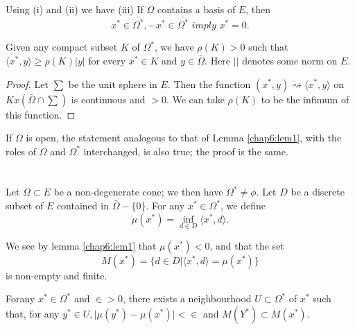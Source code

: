 Using (i) and (ii) we have 
(iii) If $\Omega $ contains a basis of $E$, then 
$$
x^* \in \bar{\Omega^*}, -x^* \in \bar{\Omega^*} \textit{ imply } x^* = 0.
$$

\setcounter{lem}{0}
\begin{lem}\label{chap6:lem1} %
  Given any compact subset $K$ of $\Omega^*$, we have $\rho (K) > 0$
  such that $\langle x^*, y\rangle \geq \rho (K) |y|$ for every $x^*
  \in K$ and $y \in \bar{\Omega}$. Here $| |$ denotes some norm on $E$.  
\end{lem}

\begin{proof}
  Let $\sum$ be the unit sphere in $E$. Then the function $(x^*,
  y)\rightsquigarrow \langle x^*, y\rangle$ on $K x (\bar{\Omega} \cap \sum )$
  is continuous and $> 0$. We can take $\rho (K)$ to be the infimum
  of this function. 
\end{proof}

\begin{remark*}
  If $\Omega$ is open, the statement analogous to that of Lemma \ref{chap6:lem1},
  with the roles of $\Omega$ and $\Omega^*$ interchanged, is also true;
  the proof is the same.  
\end{remark*}

\section{} %

Let $\Omega \subset E$ be a non-degenerate cone; we then have $\Omega^*
\neq \phi $.  Let $D$ be a discrete subset of $E$ contained in
$\bar{\Omega} - \{0\}$.  For any $x^* \in \Omega^*$, we define  
$$
\mu (x^*) = \inf_{d \in D} \langle x^*, d \rangle .
$$

We see by lemma \ref{chap6:lem1} that $\mu (x^*) < 0$, and that the set 
$$
M(x^*) = \bigg\{ d \in D \big| \langle x^*, d \rangle = \mu (x^*)\bigg\}
$$
is non-empty and finite. 

\begin{lem}\label{chap6:lem2} %
  For\pageoriginale any $x^* \in \Omega^*$ and $\in > 0$, there exists a
  neighbourhood $U \subset \Omega^*$ of $x^*$ such that, for any $y^*
  \in U, \big| \mu (y^*) - \mu (x^*) \big| < \in$ and $M (Y^*)
  \subset M (x^*)$. 
\end{lem}

